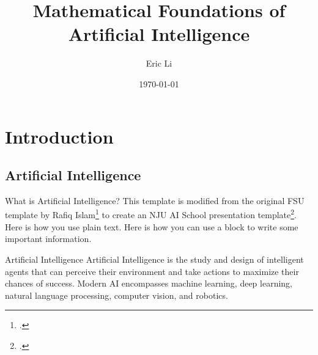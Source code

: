 \documentclass{ctexbeamer}
\title[AI Foundations]{Mathematical Foundations of Artificial Intelligence}
\author[Li]{Eric Li}
\institute{School of Artificial Intelligence, Nanjing University}
\date{\today}
\renewcommand{\cite}[1]{\footcite{#1}}
\begin{document}
\maketitle

\section{Introduction}
\subsection{Artificial Intelligence}
\begin{frame}{What is Artificial Intelligence?}
    This template is modified from the original FSU template by Rafiq Islam\cite{fsumathposter25} to create an NJU AI School presentation template\cite{njubeamerpresent25}. Here is how you use plain text. Here is how you can use a block to write some important information.
    \begin{block}{Artificial Intelligence}
        Artificial Intelligence is the study and design of intelligent agents that can perceive their environment and take actions to maximize their chances of success. Modern AI encompasses machine learning, deep learning, natural language processing, computer vision, and robotics.
    \end{block}
\end{frame}
\end{document}
